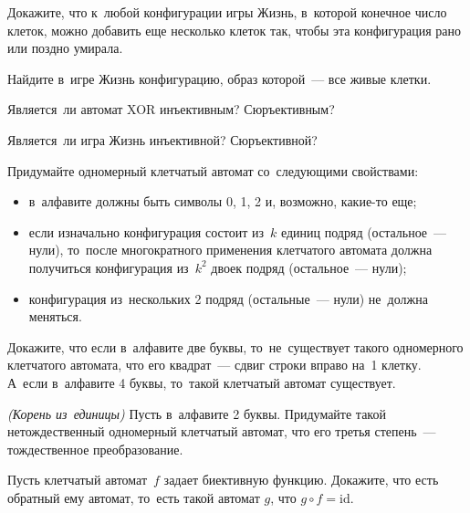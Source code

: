 



\begin{problems}

\item
Докажите, что к~любой конфигурации игры Жизнь, в~которой конечное число клеток,
можно добавить еще несколько клеток так, чтобы эта конфигурация рано или поздно
умирала.

\item
Найдите в~игре Жизнь конфигурацию, образ которой~--- все живые клетки.

\item
Является~ли автомат XOR инъективным?
Сюръективным?

\item
Является~ли игра Жизнь инъективной?
Сюръективной?

\item
Придумайте одномерный клетчатый автомат со~следующими свойствами:
\begin{itemize}
\item
в~алфавите должны быть символы 0, 1, 2 и, возможно, какие-то еще;
\item
если изначально конфигурация состоит из~$k$ единиц подряд (остальное~--- нули),
то~после многократного применения клетчатого автомата должна получиться
конфигурация из~$k^2$ двоек подряд (остальное~--- нули);
\item
конфигурация из~нескольких 2 подряд (остальные~--- нули) не~должна
меняться.
\end{itemize}

\item
\subproblem
Докажите, что если в~алфавите две буквы, то~не~существует такого одномерного
клетчатого автомата, что его квадрат~--- сдвиг строки вправо на~1 клетку.
\\
\subproblem
А~если в~алфавите 4 буквы, то~такой клетчатый автомат существует.

\item\emph{(Корень из~единицы)}
Пусть в~алфавите 2 буквы.
Придумайте такой нетождественный одномерный клетчатый автомат, что его третья
степень~--- тождественное преобразование.

\item
Пусть клетчатый автомат~$f$ задает биективную функцию.
Докажите, что есть обратный ему автомат, то~есть такой автомат $g$, что
$g \circ f = \mathrm{id}$.


\end{problems}
